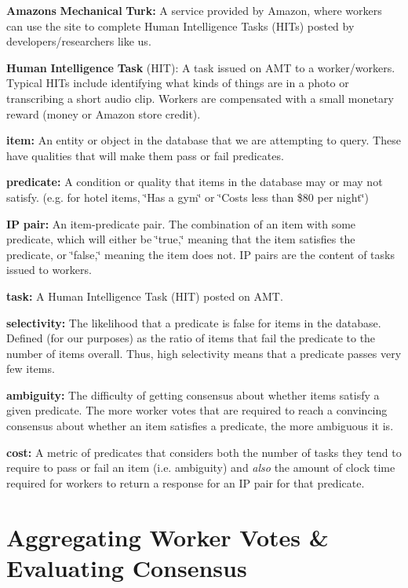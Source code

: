 \begin{DoxyItemize}
\item {\bfseries{Amazon\textquotesingle{}s}} {\bfseries{Mechanical}} {\bfseries{Turk\+:}} A service provided by Amazon, where workers can use the site to complete Human Intelligence Tasks (H\+I\+Ts) posted by developers/researchers like us.
\item {\bfseries{Human}} {\bfseries{Intelligence}} {\bfseries{Task}} {\bfseries{}}(H\+IT)\+: A task issued on A\+MT to a worker/workers. Typical H\+I\+Ts include identifying what kinds of things are in a photo or transcribing a short audio clip. Workers are compensated with a small monetary reward (money or Amazon store credit).
\item {\bfseries{item\+:}} An entity or object in the database that we are attempting to query. These have qualities that will make them pass or fail predicates.
\item {\bfseries{predicate\+:}} A condition or quality that items in the database may or may not satisfy. (e.\+g. for hotel items, \char`\"{}\+Has a gym\char`\"{} or \char`\"{}\+Costs less than \$80 per night\char`\"{})
\item {\bfseries{IP}} {\bfseries{pair\+:}} An item-\/predicate pair. The combination of an item with some predicate, which will either be \char`\"{}true,\char`\"{} meaning that the item satisfies the predicate, or \char`\"{}false,\char`\"{} meaning the item does not. IP pairs are the content of tasks issued to workers.
\item {\bfseries{task\+:}} A Human Intelligence Task (H\+IT) posted on A\+MT.
\item {\bfseries{selectivity\+:}} The likelihood that a predicate is false for items in the database. Defined (for our purposes) as the ratio of items that fail the predicate to the number of items overall. Thus, high selectivity means that a predicate passes very few items.
\item {\bfseries{ambiguity\+:}} The difficulty of getting consensus about whether items satisfy a given predicate. The more worker votes that are required to reach a convincing consensus about whether an item satisfies a predicate, the more ambiguous it is.
\item {\bfseries{cost\+:}} A metric of predicates that considers both the number of tasks they tend to require to pass or fail an item (i.\+e. ambiguity) and {\itshape also} the amount of clock time required for workers to return a response for an IP pair for that predicate.
\end{DoxyItemize}\hypertarget{index_consensus}{}\section{Aggregating Worker Votes \& Evaluating Consensus}\label{index_consensus}

